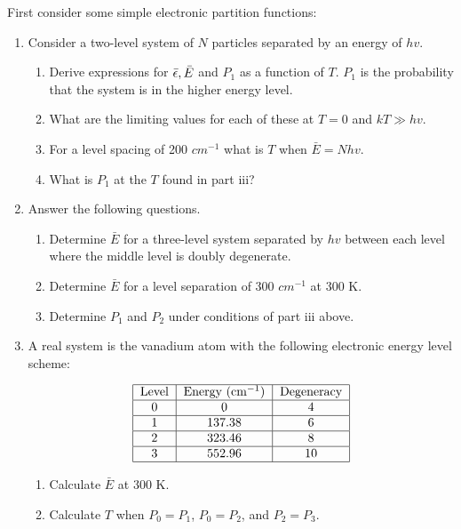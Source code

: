 \item First consider some simple electronic partition functions:
\begin{enumerate}
    \item Consider a two-level system of $N$ particles separated by an energy of $hv$.
          \begin{enumerate}
              \item Derive expressions for $\bar{\epsilon},\bar{E}$ and $P_1$ as a function of $T$. $P_1$ is the
                    probability that the system is in the higher energy level.
              \item What are the limiting values for each of these at $T=0$ and $kT\gg hv$.
              \item For a level spacing of 200 $cm^{-1}$ what is $T$ when $\bar{E}=Nhv$.
              \item What is $P_1$ at the $T$ found in part iii?
          \end{enumerate}
    \item Answer the following questions.
          \begin{enumerate}
              \item Determine $\bar{E}$ for a three-level system separated by $hv$ between each level where the middle
                    level is doubly degenerate.
              \item Determine $\bar{E}$ for a level separation of 300 $cm^{-1}$ at 300 K.
              \item Determine $P_1$ and $P_2$ under conditions of part iii above.
          \end{enumerate}
    \item A real system is the vanadium atom with the following electronic energy level scheme:
          \begin{table}[!htb]
              \begin{align*}
                  \begin{tabular}{|c|c|c|}
                      \hline
                      Level & Energy (cm$^{-1})$ & Degeneracy \\
                      \hline
                      0     & 0                  & 4          \\
                      \hline
                      1     & 137.38             & 6          \\
                      \hline
                      2     & 323.46             & 8          \\
                      \hline
                      3     & 552.96             & 10         \\
                      \hline
                  \end{tabular}
              \end{align*}
          \end{table}
          \begin{enumerate}
              \item Calculate $\bar{E}$ at 300 K.
              \item Calculate $T$ when $P_0=P_1$, $P_0=P_2$, and $P_2=P_3$.
          \end{enumerate}
\end{enumerate}

